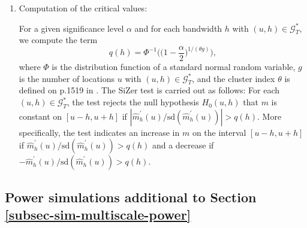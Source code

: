 \begin{enumerate}[leftmargin=0.7cm,label=(\alph*)]
\item Computation of the critical values:  

For a given significance level $\alpha$ and for each bandwidth $h$ with $(u,h) \in \mathcal{G}_T^*$, we compute the term 
\[ q(h) = \Phi^{-1} \Big( \Big( 1 - \frac{\alpha}{2} \Big)^{1/(\theta g)} \Big), \]
where $\Phi$ is the distribution function of a standard normal random variable, $g$ is the number of locations $u$ with $(u,h) \in \mathcal{G}_T^*$, and the cluster index $\theta$ is defined on p.1519 in \cite{ParkHannigKang2009}. The SiZer test is carried out as follows: For each $(u,h) \in \mathcal{G}_T^*$, the test rejects the null hypothesis $H_0(u,h)$ that $m$ is constant on $[u-h,u+h]$ if $|\widehat{m}^\prime_h(u) / \text{sd}(\widehat{m}^\prime_h(u)) | > q(h)$. More specifically, the test indicates an increase in $m$ on the interval $[u-h,u+h]$ if $\widehat{m}^\prime_h(u) / \text{sd}(\widehat{m}^\prime_h(u)) > q(h)$ and a decrease if $-\widehat{m}^\prime_h(u) / \text{sd}(\widehat{m}^\prime_h(u)) > q(h)$.


\end{enumerate}


\subsection*{Power simulations additional to Section \ref{subsec-sim-multiscale-power}}


